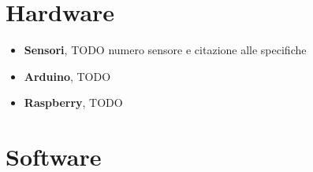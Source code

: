 \documentclass[12pt,a4paper,openright,twoside]{book}
\begin{document}


\section{Hardware}

\begin{itemize}
    \item \textbf{Sensori}, TODO numero sensore e citazione alle specifiche
    \item \textbf{Arduino}, TODO
    \item \textbf{Raspberry}, TODO
\end{itemize}
    
\section{Software}
\end{document}
